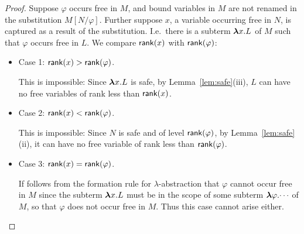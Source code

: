 \documentclass{article}
\newcommand\rank[1]{{\sf rank}(#1)}
\begin{document}
\begin{proof} Suppose $\varphi$ occurs free in $M$, and
bound variables in $M$ are not renamed in the substitution $M[N /
\varphi]$. Further suppose $x$, a variable occurring free in $N$, is
captured as a result of the substitution. I.e.~there is a subterm
${\hbox{\boldmath $\lambda$}{x}.{L}}$ of $M$ such that $\varphi$ occurs free in $L$. We
compare $\rank{x}$ with $\rank{\varphi}$:

\begin{itemize}
\item {Case 1}: $\rank{x} > \rank{\varphi}$.

This is impossible: Since ${\hbox{\boldmath $\lambda$}{x}.{L}}$ is safe, by
Lemma~\ref{lem:safe}(iii), $L$ can have no free variables of rank
less than $\rank{x}$.

\item {Case 2}: $\rank{x} < \rank{\varphi}$.

This is impossible: Since $N$ is safe and of level $\rank{\varphi}$,
by Lemma~\ref{lem:safe}(ii), it can have no free variable of rank
less than $\rank{\varphi}$.

\item {Case 3}: $\rank{x} = \rank{\varphi}$.

If follows from the formation rule for $\lambda$-abstraction that
$\varphi$ cannot occur free in $M$ since the subterm ${\hbox{\boldmath $\lambda$}{x}.{L}}$
must be in the scope of some subterm ${\hbox{\boldmath $\lambda$}{\varphi}.{\cdots}}$ of
$M$, so that $\varphi$ does not occur free in $M$. Thus this case
cannot arise either.
\end{itemize}

\end{proof}



\end{document}
